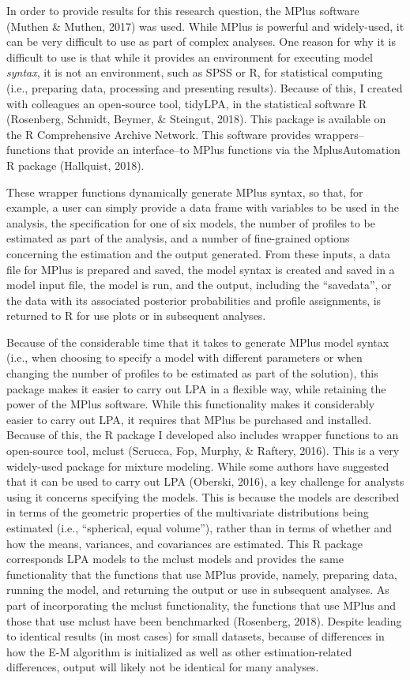 \documentclass[]{msu-thesis}
\theoremstyle{definition}
\theoremstyle{definition}
\theoremstyle{definition}
\theoremstyle{remark}
\begin{document}
In order to provide results for this research question, the MPlus
software (Muthen \& Muthen, 2017) was used. While MPlus is powerful and
widely-used, it can be very difficult to use as part of complex
analyses. One reason for why it is difficult to use is that while it
provides an environment for executing model \emph{syntax}, it is not an
environment, such as SPSS or R, for statistical computing (i.e.,
preparing data, processing and presenting results). Because of this, I
created with colleagues an open-source tool, tidyLPA, in the statistical
software R (Rosenberg, Schmidt, Beymer, \& Steingut, 2018). This package
is available on the R Comprehensive Archive Network. This software
provides wrappers--functions that provide an interface--to MPlus
functions via the MplusAutomation R package (Hallquist, 2018).

These wrapper functions dynamically generate MPlus syntax, so that, for
example, a user can simply provide a data frame with variables to be
used in the analysis, the specification for one of six models, the
number of profiles to be estimated as part of the analysis, and a number
of fine-grained options concerning the estimation and the output
generated. From these inputs, a data file for MPlus is prepared and
saved, the model syntax is created and saved in a model input file, the
model is run, and the output, including the ``savedata'', or the data
with its associated posterior probabilities and profile assignments, is
returned to R for use plots or in subsequent analyses.

Because of the considerable time that it takes to generate MPlus model
syntax (i.e., when choosing to specify a model with different parameters
or when changing the number of profiles to be estimated as part of the
solution), this package makes it easier to carry out LPA in a flexible
way, while retaining the power of the MPlus software. While this
functionality makes it considerably easier to carry out LPA, it requires
that MPlus be purchased and installed. Because of this, the R package I
developed also includes wrapper functions to an open-source tool, mclust
(Scrucca, Fop, Murphy, \& Raftery, 2016). This is a very widely-used
package for mixture modeling. While some authors have suggested that it
can be used to carry out LPA (Oberski, 2016), a key challenge for
analysts using it concerns specifying the models. This is because the
models are described in terms of the geometric properties of the
multivariate distributions being estimated (i.e., ``spherical, equal
volume''), rather than in terms of whether and how the means, variances,
and covariances are estimated. This R package corresponds LPA models to
the mclust models and provides the same functionality that the functions
that use MPlus provide, namely, preparing data, running the model, and
returning the output or use in subsequent analyses. As part of
incorporating the mclust functionality, the functions that use MPlus and
those that use mclust have been benchmarked (Rosenberg, 2018). Despite
leading to identical results (in most cases) for small datasets, because
of differences in how the E-M algorithm is initialized as well as other
estimation-related differences, output will likely not be identical for
many analyses.
\end{document}
